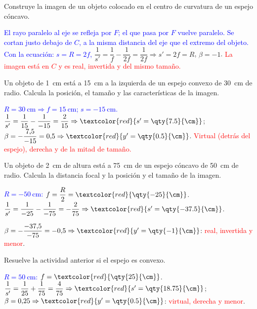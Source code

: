 \begin{exercise}
    Construye la imagen de un objeto colocado en el centro de curvatura de un espejo cóncavo.
    \begin{solu}
        \textcolor{blue}{El rayo paralelo al eje se refleja por \(F\); el que pasa por \(F\) vuelve paralelo. Se cortan
        justo debajo de \(C\), a la misma distancia del eje que el extremo del objeto. Con la ecuación: \(s = R = 2f\),}
        \(\dfrac{1}{s'} = \dfrac{1}{f} - \dfrac{1}{2f} = \dfrac{1}{2f} \Rightarrow s' = 2f = R\), \(\beta = -1\).
        \textcolor{red}{La imagen está en \(C\) y es real, invertida y del mismo tamaño.}
    \end{solu}
\end{exercise}

\begin{exercise}
    Un objeto de \qty{1}{\cm} está a \qty{15}{\cm} a la izquierda de un espejo convexo de \qty{30}{\cm} de radio. Calcula
    la posición, el tamaño y las características de la imagen.
    \begin{solu}
        \textcolor{blue}{\(R = \qty{30}{\cm} \Rightarrow f = \qty{15}{\cm}\); \(s = \qty{-15}{\cm}\).}
        \(\dfrac{1}{s'} = \dfrac{1}{15} - \dfrac{1}{-15} = \dfrac{2}{15} \Rightarrow \textcolor{red}{s' = \qty{7.5}{\cm}}\);
        \(\beta = -\dfrac{7{,}5}{-15} = 0{,}5 \Rightarrow \textcolor{red}{y' = \qty{0.5}{\cm}}\).
        \textcolor{red}{Virtual (detrás del espejo), derecha y de la mitad de tamaño.}
    \end{solu}
\end{exercise}

\begin{exercise}
    Un objeto de \qty{2}{\cm} de altura está a \qty{75}{\cm} de un espejo cóncavo de \qty{50}{\cm} de radio. Calcula la
    distancia focal y la posición y el tamaño de la imagen.
    \begin{solu}
        \textcolor{blue}{\(R = \qty{-50}{\cm}\):} \(f = \dfrac{R}{2} = \textcolor{red}{\qty{-25}{\cm}}\).
        \(\dfrac{1}{s'} = \dfrac{1}{-25} - \dfrac{1}{-75} = -\dfrac{2}{75} \Rightarrow \textcolor{red}{s' = \qty{-37.5}{\cm}}\).

        \(\beta = -\dfrac{-37{,}5}{-75} = -0{,}5 \Rightarrow \textcolor{red}{y' = \qty{-1}{\cm}}\): \textcolor{red}{real, invertida y menor}.
    \end{solu}
\end{exercise}

\begin{exercise}
    Resuelve la actividad anterior si el espejo es convexo.
    \begin{solu}
        \textcolor{blue}{\(R = \qty{50}{\cm}\):} \(f = \textcolor{red}{\qty{25}{\cm}}\).
        \(\dfrac{1}{s'} = \dfrac{1}{25} + \dfrac{1}{75} = \dfrac{4}{75} \Rightarrow \textcolor{red}{s' = \qty{18.75}{\cm}}\);
        \(\beta = 0{,}25 \Rightarrow \textcolor{red}{y' = \qty{0.5}{\cm}}\): \textcolor{red}{virtual, derecha y menor}.
    \end{solu}
\end{exercise}

